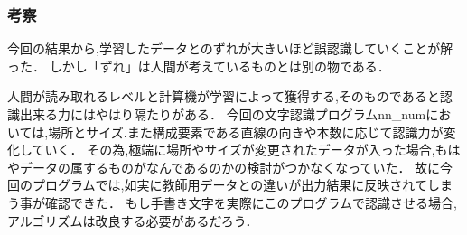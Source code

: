 \subsubsection{考察}
今回の結果から,学習したデータとのずれが大きいほど誤認識していくことが解った．
しかし「ずれ」は人間が考えているものとは別の物である．


人間が読み取れるレベルと計算機が学習によって獲得する,そのものであると認識出来る力にはやはり隔たりがある．
今回の文字認識プログラムnn\_numにおいては,場所とサイズ.また構成要素である直線の向きや本数に応じて認識力が変化していく．
その為,極端に場所やサイズが変更されたデータが入った場合,もはやデータの属するものがなんであるのかの検討がつかなくなっていた．
故に今回のプログラムでは,如実に教師用データとの違いが出力結果に反映されてしまう事が確認できた．
もし手書き文字を実際にこのプログラムで認識させる場合,アルゴリズムは改良する必要があるだろう．

